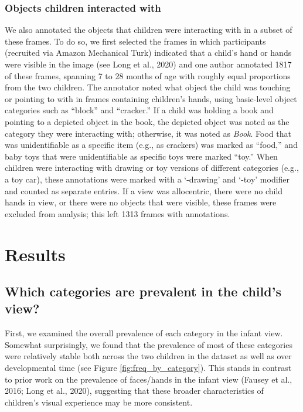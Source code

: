 \documentclass[10pt, letterpaper]{article}
\begin{document}
\hypertarget{objects-children-interacted-with}{%
\subsubsection{Objects children interacted
with}\label{objects-children-interacted-with}}

We also annotated the objects that children were interacting with in a
subset of these frames. To do so, we first selected the frames in which
participants (recruited via Amazon Mechanical Turk) indicated that a
child's hand or hands were visible in the image (see Long et al., 2020)
and one author annotated 1817 of these frames, spanning 7 to 28 months
of age with roughly equal proportions from the two children. The
annotator noted what object the child was touching or pointing to with
in frames containing children's hands, using basic-level object
categories such as ``block'' and ``cracker.'' If a child was holding a
book and pointing to a depicted object in the book, the depicted object
was noted as the category they were interacting with; otherwise, it was
noted as \emph{Book}. Food that was unidentifiable as a specific item
(e.g., as crackers) was marked as ``food,'' and baby toys that were
unidentifiable as specific toys were marked ``toy.'' When children were
interacting with drawing or toy versions of different categories (e.g.,
a toy car), these annotations were marked with a `-drawing' and `-toy'
modifier and counted as separate entries. If a view was allocentric,
there were no child hands in view, or there were no objects that were
visible, these frames were excluded from analysis; this left 1313 frames
with annotations.

\hypertarget{results}{%
\section{Results}\label{results}}

\hypertarget{which-categories-are-prevalent-in-the-childs-view}{%
\subsection{Which categories are prevalent in the child's
view?}\label{which-categories-are-prevalent-in-the-childs-view}}

First, we examined the overall prevalence of each category in the infant
view. Somewhat surprisingly, we found that the prevalence of most of
these categories were relatively stable both across the two children in
the dataset as well as over developmental time (see Figure
\ref{fig:freq_by_category}). This stands in contrast to prior work on
the prevalence of faces/hands in the infant view (Fausey et al., 2016;
Long et al., 2020), suggesting that these broader characteristics of
children's visual experience may be more consistent.
\end{document}
